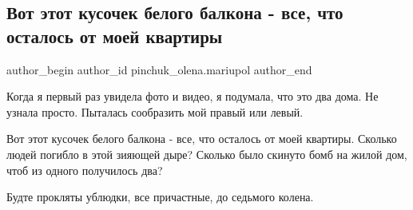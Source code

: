  
 
 
 
 

\subsection{Вот этот кусочек белого балкона - все, что осталось от моей квартиры}
\label{sec:19_03_2022.fb.pinchuk_olena.mariupol.1.kusochek_belogo_balkona_kvartira}

\ifcmt
 author_begin
   author_id pinchuk_olena.mariupol
 author_end
\fi

Когда я первый раз увидела фото и видео, я подумала, что это два дома. Не
узнала просто. Пыталась сообразить мой правый или левый. 

Вот этот кусочек белого балкона - все, что осталось от моей квартиры. Сколько
людей погибло в этой зияющей дыре? Сколько было скинуто бомб на жилой дом, чтоб
из одного получилось два? 

Будте прокляты ублюдки, все причастные, до седьмого колена.


